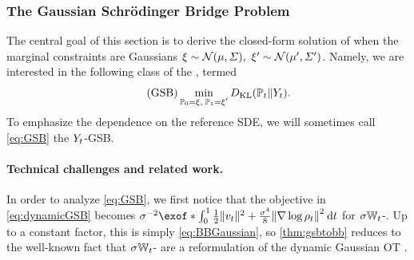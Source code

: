 \subsubsection{The Gaussian Schr{\"o}dinger Bridge Problem}
\label{sec:tere}

The central goal of this section is to derive the closed-form solution of  when the marginal constraints are Gaussians $\xi \sim \mathcal{N}(\mu, \Sigma),\ \xi' \sim \mathcal{N}(\mu', \Sigma')$. Namely, we are interested in the following class of the , termed  %
\begin{equation}
\label{eq:GSB}
\tag{GSB}
\min_{ \substack{ \Pinit = \xi, \; \Pend = \xi'} } \KL( \Pmargin \| \refsde).%
\end{equation}
To emphasize the dependence on the reference \acrshort{SDE}, we will sometimes call \eqref{eq:GSB} the $Y_{ t }$-\acrshort{GSB}. 


%


\paragraph{Technical challenges and related work.} In order to analyze \eqref{eq:GSB}, we first notice that the objective in \eqref{eq:dynamicGSB} becomes $\sigma^{-2}\exof*{\int_{0}^\horizon  \frac{1}{2} \norm{\vect}^2 + \frac{\sigma^4}{8} \norm*{\nabla\log\measure}^2 \dt}$ for $\sigma\mathbb{W}_{t}$-. Up to a constant factor, this is simply \eqref{eq:BBGaussian}, so \cref{thm:gsbtobb} reduces to the well-known fact that $\sigma\mathbb{W}_{t}$- are a reformulation of the dynamic Gaussian \acrshort{OT} \citep{leonard2013survey, chen2016relation, gentil2017analogy}. 

